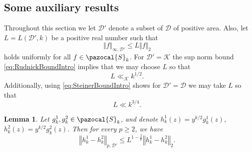 \documentclass[12pt, a4paper]{amsart}
\newtheorem{lemma}[theorem]{Lemma}
\theoremstyle{definition}
\newcommand {\1} {\mathbf{1}}
\newcommand {\Dc} {\mathcal{D}}
\newcommand {\Kc} {\mathcal{K}}
\newcommand{\Sc}{{\pazocal{S}}}
\newcommand{\lk}{{L}}
\numberwithin{equation}{section}
\begin{document}
\subsection{Some auxiliary results}

Throughout this section we let $\mathcal D'$ denote a subset of $\mathcal D$ of positive area. Also, let $\lk=L(\mathcal D',k)$ be a positive real number such that
\begin{equation}
\label{eq:RudnickBound}
\left\Vert f \right\Vert_{\infty,\mathcal D'}\le \lk \left\Vert f \right\Vert _{2}
\end{equation}
holds uniformly for all $f \in \Sc_k$. For $\mathcal D'=\Kc$
the sup norm bound \eqref{eq:RudnickBoundIntro} implies that we may choose $\lk $ so that
\begin{equation} \label{eq:Lbd1}
\lk \ll_{\Kc} k^{1/2}.
\end{equation}
Additionally, using \eqref{eq:SteinerBoundIntro} shows for $\mathcal D'=\mathcal D$ we may take $\lk$ so that
\begin{equation} \label{eq:Lbd2}
\lk \ll k^{3/4}.
\end{equation}

\begin{lemma}
\label{lem:LpBound}
Let $g_{k}^{1},g_{k}^{2}  \in \Sc_k$,
and denote $h_{k}^{1}\left(z\right)=y^{k/2}g_{k}^{1}\left(z\right)$,
$h_{k}^{2}\left(z\right)=y^{k/2}g_{k}^{2}\left(z\right)$. Then
for every
$p\ge2$, we have
\[
\left\Vert h_{k}^{1}-h_{k}^{2}\right\Vert _{p,\Dc'}\le  \lk^{1-\frac{2}{p}}\left\Vert h_{k}^{1}-h_{k}^{2}\right\Vert _{2}.
\]

\end{lemma}
\end{document}
